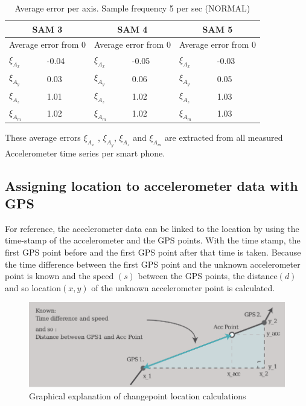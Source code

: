 \renewcommand{\arraystretch}{1.5}
\renewcommand{\tabcolsep}{0.2cm}
\begin{table}[h]
\centering
\caption{Average error per axis. Sample frequency 5 per sec (NORMAL)}
\label{averageerror}
\begin{tabular}{|p{56.6pt}|p{56.6pt}|p{56.6pt}|p{56.6pt}|p{56.6pt}|p{56.6pt}|} 
\hline
\multicolumn{2}{|c|}{SAM 3} & \multicolumn{2}{|c|}{SAM 4} & \multicolumn{2}{|c|}{SAM 5} \\
\hline
\multicolumn{2}{|c|}{Average error from 0} & \multicolumn{2}{|c|}{Average error from 0} & \multicolumn{2}{|c|}{Average error from 0} \\ 
\hline
$\xi_{A_x}$ & -0.04 &$\xi_{A_x}$ & -0.05 &$\xi_{A_x}$ & -0.03 \\
$\xi_{A_y}$ & 0.03 & $\xi_{A_y}$ & 0.06 & $\xi_{A_y}$ & 0.05 \\
$\xi_{A_z}$ & 1.01 & $\xi_{A_z}$ & 1.02 & $\xi_{A_z}$ & 1.03 \\
$\xi_{A_m}$ & 1.02 & $\xi_{A_m}$ & 1.02 & $\xi_{A_m}$ & 1.03 \\
\hline
\end{tabular}
\end{table}

These average errors $\xi_{A_x}$ , $\xi_{A_y}$, $\xi_{A_z}$ and $\xi_{A_m}$ are extracted from all measured Accelerometer time series per smart phone. 

\subsection{Assigning location to accelerometer data with GPS}\label{locationassigning}
For reference, the accelerometer data can be linked to the location by using the time-stamp of the accelerometer and the GPS points. With the time stamp, the first GPS point before and the first GPS point after that time is taken. Because the time difference between the first GPS point and the unknown accelerometer point is known and the speed $(s)$ between the GPS points, the distance$(d)$ and so location$(x,y)$ of the unknown accelerometer point is calculated. 

\begin{figure}[H]
\includegraphics[width=\textwidth]{img/M_location_calc.pdf}
\centering
\caption{Graphical explanation of changepoint location calculations \label{cpcalc}}
\end{figure}

